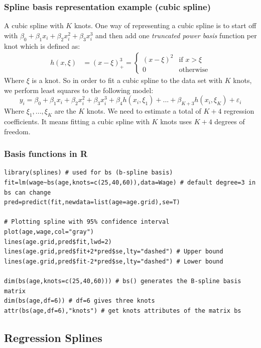 \documentclass[11pt]{article}
\begin{document}
\subsubsection{Spline basis representation example (cubic spline)}
\noindent A cubic spline with $K$ knots. One way of representing a cubic spline is to start off with $\beta_0+\beta_1x_i + \beta_2x_i^2 + \beta_3x_i^3$ and then add one \textit{truncated power basis} function per knot which is defined as:
\begin{align*}
    h(x, \xi) &= (x - \xi)_{+}^{3} = \begin{cases}
        (x-\xi)^2 & \text{if } x > \xi \\
        0 & \text{otherwise}
    \end{cases}
\end{align*}
\noindent Where $\xi$ is a knot. So in order to fit a cubic spline to the data set with $K$ knots, we perform least squares to the following model:
$$y_i = \beta_0 + \beta_1x_i + \beta_2x_i^2 + \beta_3x_i^3 + \beta_4h(x_i, \xi_1) + ... + \beta_{K+3}h(x_i, \xi_K) + \varepsilon_i$$
\noindent Where $\xi_1,...,\xi_K$ are the $K$ knots. We need to estimate a total of $K+4$ regression coefficients. It means fitting a cubic spline with $K$ knots uses $K+4$ degrees of freedom.

\subsubsection{Basis functions in R}
\begin{lstlisting}
library(splines) # used for bs (b-spline basis)
fit=lm(wage~bs(age,knots=c(25,40,60)),data=Wage) # default degree=3 in bs can change
pred=predict(fit,newdata=list(age=age.grid),se=T)

# Plotting spline with 95% confidence interval
plot(age,wage,col="gray")
lines(age.grid,pred$fit,lwd=2)
lines(age.grid,pred$fit+2*pred$se,lty="dashed") # Upper bound
lines(age.grid,pred$fit-2*pred$se,lty="dashed") # Lower bound

dim(bs(age,knots=c(25,40,60))) # bs() generates the B-spline basis matrix
dim(bs(age,df=6)) # df=6 gives three knots
attr(bs(age,df=6),"knots") # get knots attributes of the matrix bs
\end{lstlisting}

\subsection{Regression Splines}
\end{document}
